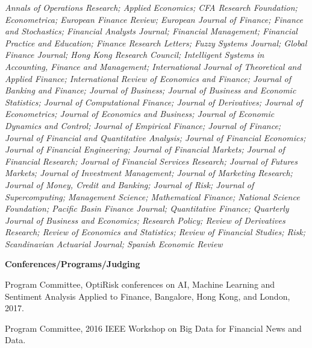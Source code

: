 \documentclass{article}
\begin{document}
\begin{description}
{\it 
Annals of Operations Research; 
Applied Economics; 
CFA Research Foundation; 
Econometrica; 
European Finance Review; 
European Journal of Finance; 
Finance and Stochastics; 
Financial Analysts Journal; 
Financial Management; 
Financial Practice and Education; 
Finance Research Letters; 
Fuzzy Systems Journal; 
Global Finance Journal; 
Hong Kong Research Council; 
Intelligent Systems in Accounting, Finance and Management; 
International Journal of Theoretical and Applied Finance; 
International Review of Economics and Finance; 
Journal of Banking and Finance; 
Journal of Business; 
Journal of Business and Economic Statistics; 
Journal of Computational Finance; 
Journal of Derivatives; 
Journal of Econometrics; 
Journal of Economics and Business; 
Journal of Economic Dynamics and Control; 
Journal of Empirical Finance; 
Journal of Finance; 
Journal of Financial and Quantitative Analysis; 
Journal of Financial Economics; 
Journal of Financial Engineering; 
Journal of Financial Markets; 
Journal of Financial Research; 
Journal of Financial Services Research; 
Journal of Futures Markets; 
Journal of Investment Management; 
Journal of Marketing Research; 
Journal of Money, Credit and Banking; 
Journal of Risk; 
Journal of Supercomputing; 
Management Science; 
Mathematical Finance; 
National Science Foundation; 
Pacific Basin Finance Journal; 
Quantitative Finance; 
Quarterly Journal of Business and Economics; 
Research Policy; 
Review of Derivatives Research; 
Review of Economics and Statistics; 
Review of Financial Studies; 
Risk; 
Scandinavian Actuarial Journal; 
Spanish Economic Review
}

%

\item {\bf Conferences/Programs/Judging}

\begin{etaremune}
\setlength\itemsep{-0.3em}

\item Program Committee, OptiRisk conferences on AI, Machine Learning and Sentiment Analysis Applied to Finance, Bangalore, Hong Kong, and London, 2017. 

\item Program Committee, 2016 IEEE Workshop on Big Data for Financial News and Data.


\end{etaremune}
\end{description}
\end{document}
